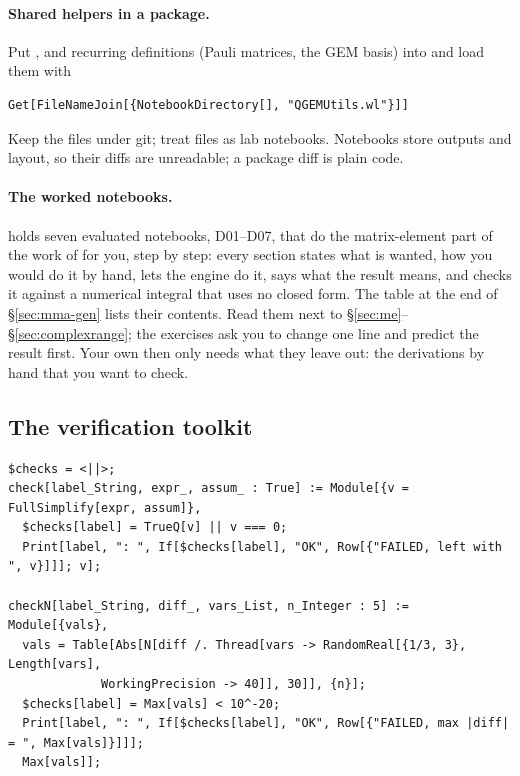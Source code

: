\documentclass[11pt,a4paper]{article}
\numberwithin{equation}{section}
\theoremstyle{definition}
\theoremstyle{plain}
\theoremstyle{remark}
\numberwithin{algorithm}{section}
\begin{document}
\paragraph{Shared helpers in a package.} Put ,  and recurring definitions (Pauli matrices, the GEM basis) into  and load them with
\begin{lstlisting}[style=wl]
Get[FileNameJoin[{NotebookDirectory[], "QGEMUtils.wl"}]]
\end{lstlisting}
Keep the  files under git; treat  files as lab notebooks. Notebooks store outputs and layout, so their diffs are unreadable; a package diff is plain code.

\paragraph{The worked notebooks.}  holds seven evaluated notebooks, D01--D07, that do the matrix-element part of the work of  for you, step by step: every section states what is wanted, how you would do it by hand, lets the engine  do it, says what the result means, and checks it against a numerical integral that uses no closed form. The table at the end of \S\ref{sec:mma-gen} lists their contents. Read them next to \S\ref{sec:me}--\S\ref{sec:complexrange}; the exercises ask you to change one line and predict the result first. Your own  then only needs what they leave out: the derivations by hand that you want to check.

\subsection{The verification toolkit}\label{sec:mma-toolkit}
\begin{lstlisting}[style=wl]
$checks = <||>;
check[label_String, expr_, assum_ : True] := Module[{v = FullSimplify[expr, assum]},
  $checks[label] = TrueQ[v] || v === 0;
  Print[label, ": ", If[$checks[label], "OK", Row[{"FAILED, left with ", v}]]]; v];

checkN[label_String, diff_, vars_List, n_Integer : 5] := Module[{vals},
  vals = Table[Abs[N[diff /. Thread[vars -> RandomReal[{1/3, 3}, Length[vars],
             WorkingPrecision -> 40]], 30]], {n}];
  $checks[label] = Max[vals] < 10^-20;
  Print[label, ": ", If[$checks[label], "OK", Row[{"FAILED, max |diff| = ", Max[vals]}]]];
  Max[vals]];
\end{lstlisting}
\end{document}
